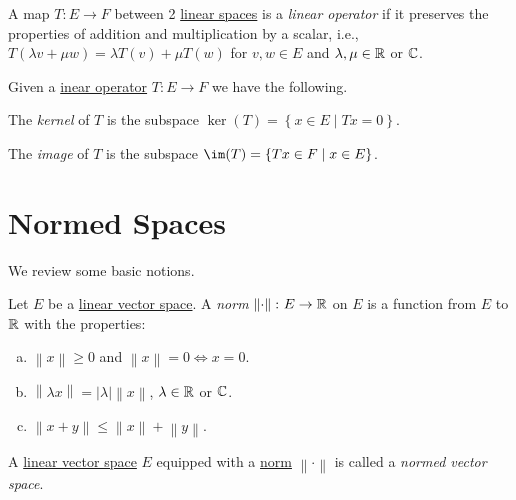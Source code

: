 \begin{definition}\label{def:linear-operator}
	A map \(T\colon E\to F\) between 2 \hyperref[def:linear-vector-space]{linear spaces} is a \emph{linear operator} if it preserves the properties of addition and multiplication by a scalar, i.e., \(T(\lambda v + \mu w) = \lambda T(v) + \mu T(w)\) for \(v, w\in E\) and \(\lambda , \mu \in \mathbb{\MakeUppercase{r}}\) or \(\mathbb{\MakeUppercase{c}}\).
\end{definition}

\begin{definition*}
	Given a \hyperref[def:linear-operator]{inear operator} \(T\colon E \to F\) we have the following.
	\begin{definition}[Kernel]
		The \emph{kernel} of \(T\) is the subspace \(\ker(T) = \left\{ x\in E\mid Tx=0 \right\} \).
	\end{definition}

	\begin{definition}[Image]
		The \emph{image} of \(T\) is the subspace \(\im(T) = \left\{ Tx\in F\mid x\in E \right\} \).
	\end{definition}
\end{definition*}

\section{Normed Spaces}
We review some basic notions.

\begin{definition}[Norm]\label{def:norm}
	Let \(E\) be a \hyperref[def:linear-vector-space]{linear vector space}. A \emph{norm} \(\left\lVert \cdot \right\rVert \colon E \to \mathbb{\MakeUppercase{r}} \) on \(E\) is a function from \(E\) to \(\mathbb{\MakeUppercase{r}} \) with the properties:
	\begin{enumerate}[(a)]
		\item \(\left\lVert x\right\rVert \geq 0\) and \(\left\lVert x\right\rVert =0 \iff x=0\).
		\item \(\left\lVert \lambda x\right\rVert = \left\vert \lambda  \right\vert \left\lVert x\right\rVert\), \(\lambda \in\mathbb{\MakeUppercase{r}} \) or \(\mathbb{\MakeUppercase{c}} \).
		\item \(\left\lVert x+y\right\rVert \leq \left\lVert x\right\rVert + \left\lVert y\right\rVert \).
	\end{enumerate}
\end{definition}

\begin{definition}\label{def:normed-vector-space}
	A \hyperref[def:linear-vector-space]{linear vector space} \(E\) equipped with a \hyperref[def:norm]{norm} \(\left\lVert \cdot\right\rVert \) is called a \emph{normed vector space}.
\end{definition}

